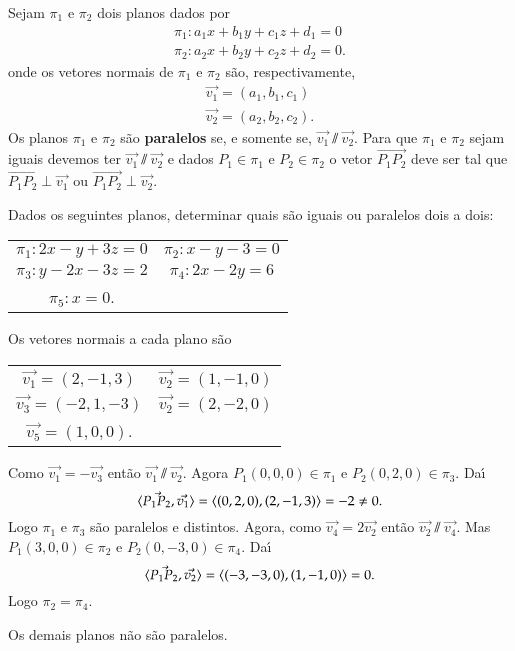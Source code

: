 Sejam $\pi_1$ e $\pi_2$ dois planos dados por
    \begin{align*}
        \pi_1 : a_1x + b_1y + c_1z + d_1 = 0\\
        \pi_2 : a_2x + b_2y + c_2z + d_2 = 0.
    \end{align*}
onde os vetores normais de $\pi_1$ e $\pi_2$ s\~ao, respectivamente,
    \begin{align*}
        \vec{v_1} = (a_1, b_1, c_1)\\
        \vec{v_2} = (a_2, b_2, c_2).
    \end{align*}
Os planos $\pi_1$ e $\pi_2$ s\~ao \textbf{paralelos} se, e somente se, $\vec{v_1} \varparallel\vec{v_2}$. Para que $\pi_1$ e $\pi_2$ sejam iguais devemos ter $\vec{v_1}\varparallel\vec{v_2}$  e dados $P_1\in\pi_1$ e $P_2\in\pi_2$ o vetor $\vec{P_1P_2}$ deve ser tal que $\vec{P_1P_2}\perp\vec{v_1}$ ou $\vec{P_1P_2}\perp\vec{v_2}$.

\begin{exemplo}
    Dados os seguintes planos, determinar quais s\~ao iguais ou paralelos dois a dois:
    \begin{center}
        \begin{tabular}{cc}
            $\pi_1 : 2x - y + 3z = 0$ & 
            $\pi_2 : x - y - 3 = 0$\\
            $\pi_3 : y - 2x - 3z = 2$ & $\pi_4 : 2x - 2y = 6$\\
            $\pi_5 : x = 0$.
        \end{tabular}
    \end{center}
    \begin{solucao}
        Os vetores normais a cada plano s\~ao
        \begin{center}
            \begin{tabular}{cc}
                $\vec{v_1} = (2, -1, 3)$ & $\vec{v_2} = (1,-1,0)$\\
                $\vec{v_3} = (-2, 1, -3)$ & $\vec{v_2} = (2,-2,0)$\\
                $\vec{v_5} = (1, 0, 0)$.
            \end{tabular}
        \end{center}
        Como $\vec{v_1} = -\vec{v_3}$ ent\~ao $\vec{v_1}\varparallel\vec{v_2}$. Agora $P_1(0,0,0)\in\pi_1$ e $P_2(0,2,0)\in\pi_3$. Da{\'\i}
        \[
            \langle \vec{P_1P_2}, \vec{v_1} \rangle = \langle(0,2,0), (2,-1,3)\rangle = -2 \ne 0.
        \]
        Logo $\pi_1$ e $\pi_3$ s\~ao paralelos e distintos.
        Agora, como $\vec{v_4} = 2\vec{v_2}$ ent\~ao $\vec{v_2}\varparallel\vec{v_4}$. Mas $P_1(3,0,0)\in\pi_2$ e $P_2(0,-3,0)\in\pi_4$. Da{\'\i}
        \[
            \langle \vec{P_1P_2}, \vec{v_2} \rangle = \langle(-3,-3,0), (1,-1,0)\rangle = 0.
        \]
        Logo $\pi_2 =\pi_4$.

        Os demais planos n\~ao s\~ao paralelos.
    \end{solucao}
\end{exemplo}

